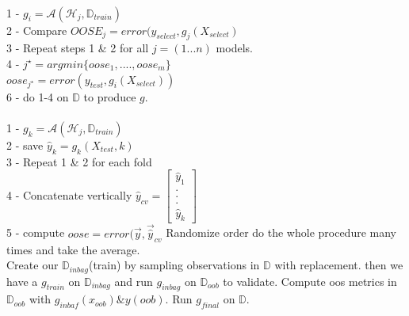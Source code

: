 \documentclass[12pt]{article}
\begin{document}


\begin{enumerate}

\\
1 - $g_i = \mathcal{A} (\mathcal{H}_j, \mathbb{D}_{train})$\\ 2 - Compare $OOSE_j = error(y_{select}, g_j(X_{select})$\\ 3 - Repeat steps 1 \& 2 for all $j = (1...n)$ models. \\ 4 - $j^\star = argmin \{oose_1, ...., oose_m\}$ \\ $oose_{j^\star} = error (y_{test}, g_i (X_{select}))$ \\ 6 - do 1-4 on $\mathbb{D}$ to produce $g$.
\\
\\
1 - $g_k = \mathcal{A} (\mathcal{H}_j, \mathbb{D}_{train})$\\ 2 - save $\hat{y}_k = g_k (X_{test},k)$ \\ 3 - Repeat 1 \& 2 for each fold \\ 4 - Concatenate vertically $\hat{y}_{cv} = \begin{bmatrix}
\hat{y}_1 \\ . \\ . \\. \\ \hat{y}_k
\end{bmatrix} 
$\\ 5 - compute $oose = error (\vec{y}, \vec{\hat{y}}_{cv}$ Randomize order do the whole procedure many times and take the average.
\\
Create our  $\mathbb{D}_{in bag}$(train) by sampling observations in $\mathbb{D}$ with replacement. then we have a $g_{train}$ on $\mathbb{D}_{in bag}$ and run $g_{in bag}$ on $\mathbb{D}_{oob}$ to validate. Compute oos metrics in $\mathbb{D}_{oob}$ with $g_{in baf}(x_{oob}) \& y(oob)$. Run $g_{final}$ on $\mathbb{D}$.

\end{enumerate}
\end{document}
